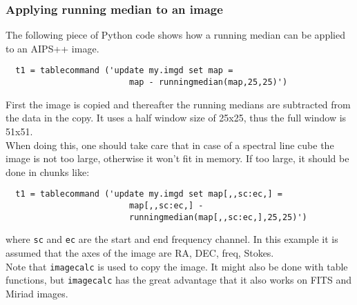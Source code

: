 \subsubsection{\label{TAQL:RUNEXAMPLES}Applying running median to an image}
The following piece of Python code shows how a running median can 
be applied to an AIPS++ image.
\begin{verbatim}
  t1 = tablecommand ('update my.imgd set map =
                         map - runningmedian(map,25,25)')
\end{verbatim}
First the image is copied and thereafter the running medians are
subtracted from the data in the copy. It uses a half window size 
of 25x25, thus the full window is 51x51.
\\When doing this, one should take care that in case of a spectral
line cube the image is not too large, otherwise it won't fit in
memory. If too large, it should be done in chunks like:
\begin{verbatim}
  t1 = tablecommand ('update my.imgd set map[,,sc:ec,] =
                         map[,,sc:ec,] -
                         runningmedian(map[,,sc:ec,],25,25)')
\end{verbatim}
where \texttt{sc} and \texttt{ec} are the start and end frequency
channel.
In this example it is assumed that the axes of the image are RA, DEC,
freq, Stokes.
\\Note that \texttt{imagecalc} is used to copy the image. It might
also be done with table functions, but \texttt{imagecalc} has the
great advantage that it also works on FITS and Miriad images.

